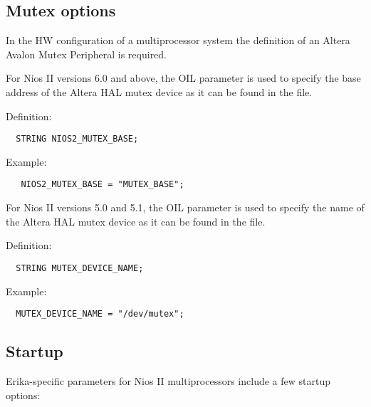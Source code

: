 \subsection{Mutex options}

In the HW configuration of a multiprocessor system the definition of
an Altera Avalon Mutex Peripheral is required. 

For Nios II versions 6.0 and above, the OIL parameter
 is used to specify the base address of the
Altera HAL mutex device as it can be found in the 
file.

Definition:

\begin{lstlisting}
  STRING NIOS2_MUTEX_BASE;
\end{lstlisting}

Example:

\begin{lstlisting}
   NIOS2_MUTEX_BASE = "MUTEX_BASE";
\end{lstlisting}

For Nios II versions 5.0 and 5.1, the OIL parameter
 is used to specify the name of the Altera
HAL mutex device as it can be found in the  file.

Definition:

\begin{lstlisting}
  STRING MUTEX_DEVICE_NAME;
\end{lstlisting}

Example:

\begin{lstlisting}
  MUTEX_DEVICE_NAME = "/dev/mutex";
\end{lstlisting}

\subsection{Startup}
\label{sec:startup}

Erika-specific parameters for Nios II multiprocessors include a few
startup options:

